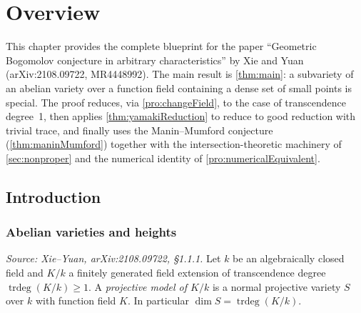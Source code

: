 \chapter{Overview}
\label{chap:overview}


\providecommand{\cA}{\mathcal{A}}
\providecommand{\cL}{\mathcal{L}}
\providecommand{\cX}{\mathcal{X}}
\providecommand{\cT}{\mathcal{T}}
\providecommand{\cBB}{\mathcal{B}}
\providecommand{\cY}{\mathcal{Y}}
\providecommand{\OK}{\overline{K}}
\providecommand{\ok}{\overline{k}}
\providecommand{\trdeg}{\operatorname{trdeg}}
\providecommand{\CH}{\operatorname{CH}}
\providecommand{\ATrace}{\operatorname{tr}}
\providecommand{\prop}{\mathrm{prop}}
\providecommand{\hath}{\hat{h}}
\providecommand{\Stab}{\operatorname{Stab}}

This chapter provides the complete blueprint for the paper ``Geometric Bogomolov conjecture in arbitrary characteristics'' by Xie and Yuan (arXiv:2108.09722, MR4448992). The main result is \cref{thm:main}: a subvariety of an abelian variety over a function field containing a dense set of small points is special. The proof reduces, via \cref{pro:changeField}, to the case of transcendence degree~1, then applies \cref{thm:yamakiReduction} to reduce to good reduction with trivial trace, and finally uses the Manin--Mumford conjecture (\cref{thm:maninMumford}) together with the intersection-theoretic machinery of \cref{sec:nonproper} and the numerical identity of \cref{pro:numericalEquivalent}.

\section{Introduction}
\label{sec:definitions}

\subsection{Abelian varieties and heights}

\begin{definition}
  \label{def:ProjectiveModel}
  \uses{}
  \textit{Source: Xie--Yuan, arXiv:2108.09722, \S1.1.1.}
  Let \(k\) be an algebraically closed field and \(K/k\) a finitely generated field extension
  of transcendence degree \(\trdeg(K/k) \geq 1\).
  A \emph{projective model of \(K/k\)} is a normal projective variety \(S\) over \(k\)
  with function field \(K\).  In particular \(\dim S = \trdeg(K/k)\).
\end{definition}

